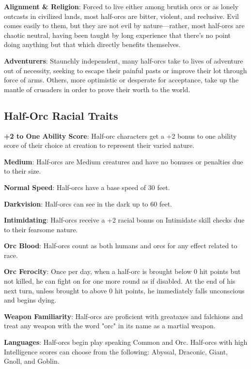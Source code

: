 \textbf{Alignment \& Religion}: Forced to live either among brutish orcs or as lonely outcasts in civilized lands, most half-orcs are bitter, violent, and reclusive. Evil comes easily to them, but they are not evil by nature---rather, most half-orcs are chaotic neutral, having been taught by long experience that there's no point doing anything but that which directly benefits themselves.
				
\textbf{Adventurers}: Staunchly independent, many half-orcs take to lives of adventure out of necessity, seeking to escape their painful pasts or improve their lot through force of arms. Others, more optimistic or desperate for acceptance, take up the mantle of crusaders in order to prove their worth to the world.
							
\subsection{Half-Orc Racial Traits}

				
\textbf{+2 to One Ability Score}: Half-orc characters get a +2 bonus to one ability score of their choice at creation to represent their varied nature.
				
\textbf{Medium}: Half-orcs are Medium creatures and have no bonuses or penalties due to their size.
				
\textbf{Normal Speed}: Half-orcs have a base speed of 30 feet.
				
\textbf{Darkvision}: Half-orcs can see in the dark up to 60 feet.
				
\textbf{Intimidating}: Half-orcs receive a +2 racial bonus on Intimidate skill checks due to their fearsome nature. 
				
\textbf{Orc Blood}: Half-orcs count as both humans and orcs for any effect related to race.
				
\textbf{Orc Ferocity}: Once per day, when a half-orc is brought below 0 hit points but not killed, he can fight on for one more round as if disabled. At the end of his next turn, unless brought to above 0 hit points, he immediately falls unconscious and begins dying.
				
\textbf{Weapon Familiarity}: Half-orcs are proficient with greataxes and falchions and treat any weapon with the word "orc" in its name as a martial weapon.
				
\textbf{Languages}: Half-orcs begin play speaking Common and Orc. Half-orcs with high Intelligence scores can choose from the following: Abyssal, Draconic, Giant, Gnoll, and Goblin.
							
